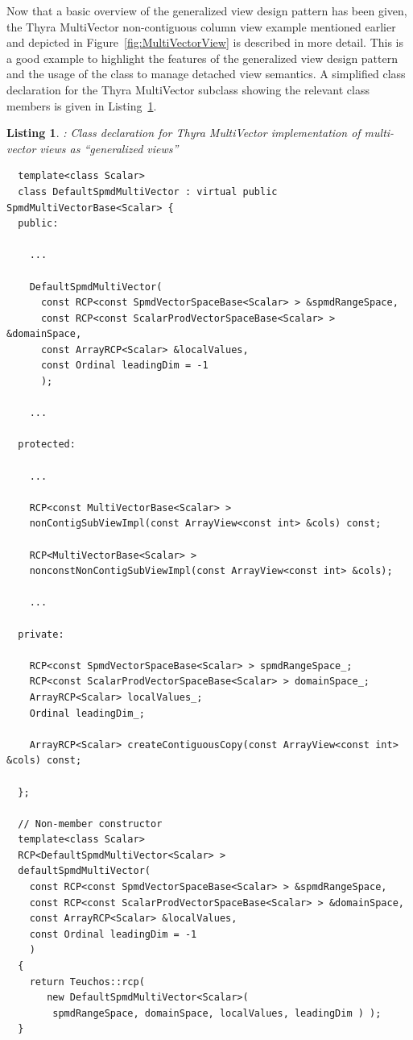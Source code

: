 \documentclass[pdf,ps2pdf,11pt]{SANDreport}
\newtheorem{listing}{Listing}
\begin{document}
Now that a basic overview of the generalized view design pattern has
been given, the Thyra MultiVector non-contiguous column view example
mentioned earlier and depicted in Figure~\ref{fig:MultiVectorView} is
described in more detail.  This is a good example to highlight the
features of the generalized view design pattern and the usage of the
{} class to manage detached view semantics.  A simplified
class declaration for the Thyra MultiVector subclass showing the
relevant class members is given in
Listing~\ref{listing:DefaultSpmdMultiVector-decl}.


\begin{listing}:  Class declaration for Thyra MultiVector implementation
of multi-vector views as ``generalized views''  \\
\label{listing:DefaultSpmdMultiVector-decl}
{\small\begin{verbatim}
  template<class Scalar>
  class DefaultSpmdMultiVector : virtual public SpmdMultiVectorBase<Scalar> {
  public:
  
    ...
  
    DefaultSpmdMultiVector(
      const RCP<const SpmdVectorSpaceBase<Scalar> > &spmdRangeSpace,
      const RCP<const ScalarProdVectorSpaceBase<Scalar> > &domainSpace,
      const ArrayRCP<Scalar> &localValues,
      const Ordinal leadingDim = -1
      );
  
    ...
  
  protected:
  
    ...
  
    RCP<const MultiVectorBase<Scalar> >
    nonContigSubViewImpl(const ArrayView<const int> &cols) const;
  
    RCP<MultiVectorBase<Scalar> >
    nonconstNonContigSubViewImpl(const ArrayView<const int> &cols);
  
    ...
    
  private:
  
    RCP<const SpmdVectorSpaceBase<Scalar> > spmdRangeSpace_;
    RCP<const ScalarProdVectorSpaceBase<Scalar> > domainSpace_;
    ArrayRCP<Scalar> localValues_;
    Ordinal leadingDim_;
  
    ArrayRCP<Scalar> createContiguousCopy(const ArrayView<const int> &cols) const;
    
  };
  
  // Non-member constructor
  template<class Scalar>
  RCP<DefaultSpmdMultiVector<Scalar> >
  defaultSpmdMultiVector(
    const RCP<const SpmdVectorSpaceBase<Scalar> > &spmdRangeSpace,
    const RCP<const ScalarProdVectorSpaceBase<Scalar> > &domainSpace,
    const ArrayRCP<Scalar> &localValues,
    const Ordinal leadingDim = -1
    )
  {
    return Teuchos::rcp(
       new DefaultSpmdMultiVector<Scalar>(
        spmdRangeSpace, domainSpace, localValues, leadingDim ) );
  }
\end{verbatim}}
\end{listing}
\end{document}
